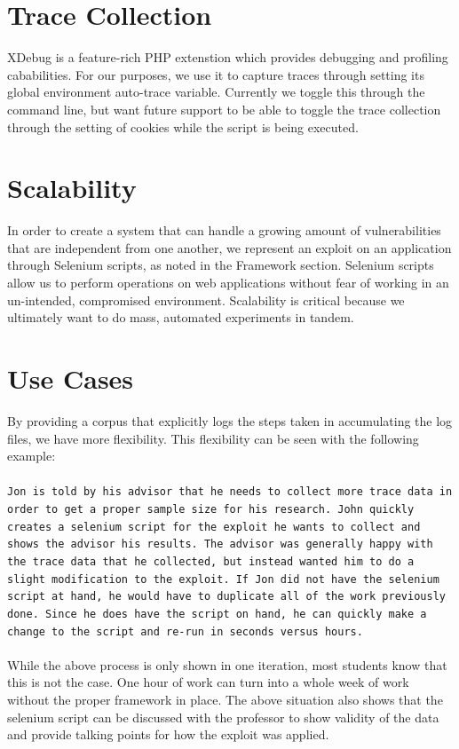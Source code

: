 \documentclass[letterpaper,twocolumn,10pt]{article}
\begin{document}
\section{Trace Collection}

XDebug is a feature-rich PHP extenstion which provides debugging and profiling cababilities.  For our purposes, we use it to capture traces through setting its global environment auto-trace variable.  Currently we toggle this through the command line, but want future support to be able to toggle the trace collection through the setting of cookies while the script is being executed.

\section{Scalability}
In order to create a system that can handle a growing amount of vulnerabilities that are independent from one another, we represent an exploit on an application through  Selenium scripts, as noted in the Framework section.  Selenium scripts allow us to perform operations on web applications without fear of working in an un-intended, compromised environment.  Scalability is critical because we ultimately want to do mass, automated experiments in tandem.  

\section{Use Cases}
By providing a corpus that explicitly logs the steps taken in accumulating the log files, we have more flexibility.  This flexibility can be seen with the following example:  
\\\\
{\tt Jon is told by his advisor that he needs to collect more trace data in order to get a proper sample size for his research.  John quickly creates a selenium script for the exploit he wants to collect and shows the advisor his results.  The advisor was generally happy with the trace data that he collected, but instead wanted him to do a slight modification to the exploit.  If Jon did not have the selenium script at hand, he would have to duplicate all of the work previously done.  Since he does have the script on hand, he can quickly make a change to the script and re-run in seconds versus hours.}
\\\\
While the above process is only shown in one iteration, most students know that this is not the case.  One hour of work can turn into a whole week of work without the proper framework in place.  The above situation also shows that the selenium script can be discussed with the professor to show validity of the data and provide talking points for how the exploit was applied.
\end{document}
